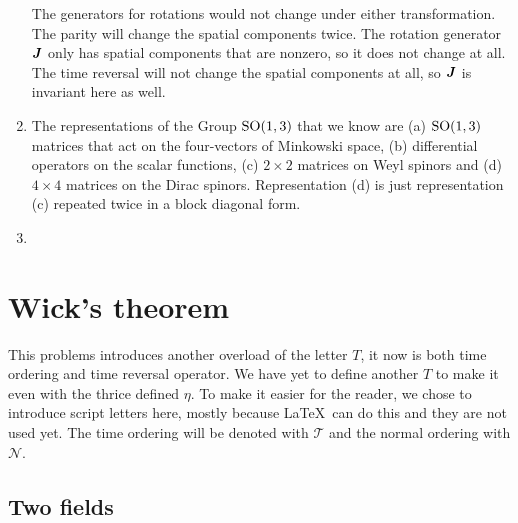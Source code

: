 \documentclass[11pt, english, fleqn, DIV=15, headinclude, BCOR=1cm]{scrartcl}
\begin{document}
\begin{enumerate}
        The generators for rotations would not change under either
        transformation. The parity will change the spatial components twice.
        The rotation generator $\mat J$ only has spatial components that are
        nonzero, so it does not change at all. The time reversal will not
        change the spatial components at all, so $\mat J$ is invariant here as
        well. 

    \item
        The representations of the Group $\mathrm{SO}(1, 3)$ that we know are (a)
        $\mathrm{SO}(1, 3)$ matrices that act on the four-vectors of Minkowski space,
        (b) differential operators on the scalar functions, (c) $2 \times 2$
        matrices on Weyl spinors and (d) $4 \times 4$ matrices on the Dirac
        spinors. Representation (d) is just representation (c) repeated twice
        in a block diagonal form.


    \item
\end{enumerate}

\section{Wick's theorem}
\label{homework:2}

\newcommand\timeorder{\mathscr T}
\newcommand\normorder{\mathscr N}

This problems introduces another overload of the letter $T$, it now is both
time ordering and time reversal operator. We have yet to define another $T$ to
make it even with the thrice defined $\eta$. To make it easier for the reader,
we chose to introduce script letters here, mostly because \LaTeX\ can do this
and they are not used yet. The time ordering will be denoted with $\timeorder$
and the normal ordering with $\normorder$.

\subsection{Two fields}
\end{document}
